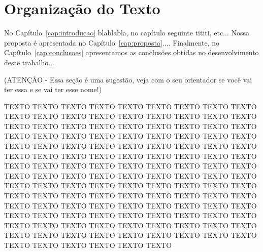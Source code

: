\section{Organização do Texto}
\label{cap:introducao:sec:organizacao:texto}

No Capítulo~\ref{cap:introducao} blablabla, no capítulo seguinte tititi, etc... Nossa proposta é apresentada no Capítulo~\ref{cap:proposta}.... Finalmente, no Capítulo~\ref{cap:conclusoes} apresentamos as conclusões obtidas no desenvolvimento deste trabalho...

(ATENÇÃO - Essa seção é uma sugestão, veja com o seu orientador se você vai ter essa e se vai ter esse nome!)

TEXTO TEXTO TEXTO TEXTO TEXTO TEXTO TEXTO TEXTO TEXTO TEXTO TEXTO TEXTO TEXTO TEXTO TEXTO TEXTO TEXTO TEXTO TEXTO TEXTO TEXTO TEXTO TEXTO TEXTO TEXTO TEXTO TEXTO TEXTO TEXTO TEXTO TEXTO TEXTO TEXTO TEXTO TEXTO TEXTO TEXTO TEXTO TEXTO TEXTO TEXTO TEXTO TEXTO TEXTO TEXTO TEXTO TEXTO TEXTO TEXTO TEXTO TEXTO TEXTO TEXTO TEXTO TEXTO TEXTO TEXTO TEXTO TEXTO TEXTO TEXTO TEXTO TEXTO TEXTO TEXTO TEXTO TEXTO TEXTO TEXTO TEXTO TEXTO TEXTO TEXTO TEXTO TEXTO TEXTO TEXTO TEXTO TEXTO TEXTO TEXTO TEXTO TEXTO TEXTO TEXTO TEXTO TEXTO TEXTO TEXTO TEXTO TEXTO TEXTO TEXTO TEXTO TEXTO TEXTO TEXTO TEXTO TEXTO TEXTO TEXTO TEXTO TEXTO TEXTO TEXTO TEXTO TEXTO TEXTO TEXTO TEXTO TEXTO TEXTO TEXTO TEXTO TEXTO TEXTO TEXTO TEXTO TEXTO TEXTO TEXTO TEXTO TEXTO TEXTO TEXTO TEXTO TEXTO TEXTO TEXTO TEXTO TEXTO TEXTO